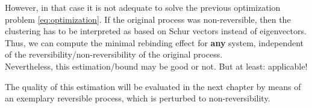 However, in that case it is not adequate to solve the previous optimization problem \eqref{eq:optimization}. If the original process was non-reversible, then the clustering has to be interpreted as based on Schur vectors instead of eigenvectors. %
\\



Thus, we can compute the minimal rebinding effect for \textbf{any} system, independent of the reversibility/non-reversibility of the original process.
\\

Nevertheless, this estimation/bound may be good or not. But at least: applicable!

The quality of this estimation will be evaluated in the next chapter by means of an exemplary reversible process, which is perturbed to non-reversibility.